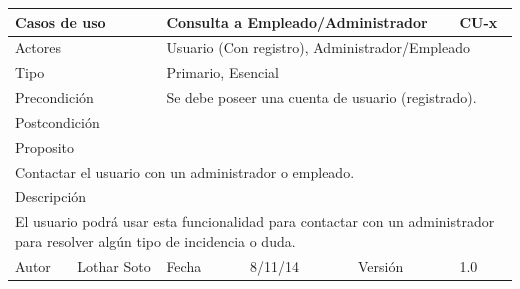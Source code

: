 \documentclass{article}
\begin{document}
\begin{table}[h]
\begin{tabular}{|l|l|l|l|l|l|}
\hline
\multicolumn{2}{|p{2cm}|}{Casos de uso}  & \multicolumn{3}{p{7cm}|}{Consulta a Empleado/Administrador} & CU-x \\
\hline
\multicolumn{2}{|p{2cm}|}{Actores}       & \multicolumn{4}{p{8cm}|}{Usuario (Con registro), Administrador/Empleado}        \\
\hline
\multicolumn{2}{|p{2cm}|}{Tipo}          & \multicolumn{4}{p{8cm}|}{Primario, Esencial}        \\
\hline
\multicolumn{2}{|p{2cm}|}{Precondición}  & \multicolumn{4}{p{8cm}|}{Se debe poseer una cuenta de usuario (registrado).}        \\
\hline
\multicolumn{2}{|p{2cm}|}{Postcondición} & \multicolumn{4}{p{8cm}|}{}        \\
\hline
\multicolumn{6}{|p{10cm}|}{Proposito}                                   \\
\hline
\multicolumn{6}{|p{10cm}|}{Contactar el usuario con un administrador o empleado.}                                            \\
\hline
\multicolumn{6}{|p{10cm}|}{Descripción}                                 \\
\hline
\multicolumn{6}{|p{10cm}|}{El usuario podrá usar esta funcionalidad para contactar con un administrador para resolver algún tipo de incidencia o duda.}                                            \\
\hline
Autor          &       Lothar Soto        & Fecha    &  8/11/14   &   Versión  & 1.0\\    
\hline
\end{tabular}
\end{table}
\end{document}
